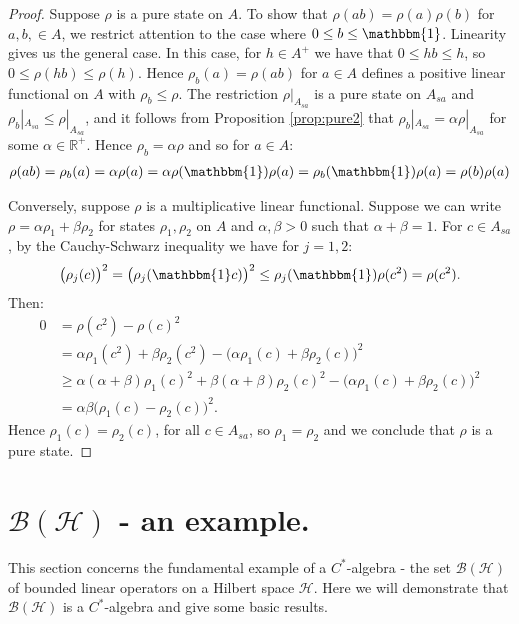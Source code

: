 \documentclass[12pt,a4paper]{report}
\theoremstyle{plain}
\theoremstyle{definition}
\newcommand{\1}{\mathbbm{1}}
\newcommand{\R}{\mathbb{R}}
\renewcommand{\H}{\mathcal{H}}
\newcommand{\B}{\mathcal{B}}
\begin{document}
\begin{proof}
	Suppose $\rho$ is a pure state on $A$. To show that $\rho(ab)=\rho(a)\rho(b)$ for $a,b,\in A$,
	we restrict attention to the case where $0\leq b\leq\1$. Linearity gives us the general case.
	In this case, for $h\in A^+$ we have that $0\leq hb\leq h$, so $0\leq\rho(hb)\leq\rho(h)$.
	Hence $\rho_b(a)=\rho(ab)$ for $a\in A$ defines a positive linear functional on $A$ with 
	$\rho_b\leq\rho$. The restriction $\rho|_{A_{sa}}$ is a pure state on $A_{sa}$ and 
	$\rho_b|_{A_{sa}} \leq \rho|_{A_{sa}}$, and it follows from Proposition \ref{prop:pure2} that 
	$\rho_b|_{A_{sa}} = \alpha \rho|_{A_{sa}}$ for some $\alpha \in \R^+$.
	Hence $\rho_b = \alpha\rho$  and so for $a\in A$:
	\begin{align*}
		\rho(ab) = \rho_b(a) = \alpha\rho(a) = 
							\alpha\rho(\1)\rho(a) = \rho_b(\1)\rho(a) = \rho(b)\rho(a)
	\end{align*}
	
	Conversely, suppose $\rho$ is a multiplicative linear functional.  %
	Suppose we can write $\rho=\alpha\rho_1+\beta\rho_2$ for states $\rho_1,\rho_2$ on $A$ and 
	$\alpha,\beta >0$ such that $\alpha+\beta=1$. For $c\in A_{sa}$, by the Cauchy-Schwarz inequality
	 we have for $j=1,2$:
	\begin{align*}
		\big(\rho_j(c)\big)^2 = \big(\rho_j(\1 c)\big)^2 \leq \rho_j(\1)\rho(c^2)=\rho(c^2).
	\end{align*}
	Then:
	\begin{align*}
				0
		&=		\rho(c^2)-\rho(c)^2 											\\
		&=		\alpha\rho_1(c^2)+\beta\rho_2(c^2) 
						- \big(\alpha\rho_1(c)+\beta\rho_2(c)\big)^2			\\
		&\geq	\alpha(\alpha+\beta)\rho_1(c)^2 
						+ \beta(\alpha+\beta)\rho_2(c)^2
						- \big(\alpha\rho_1(c)+\beta\rho_2(c)\big)^2			\\
		&=		\alpha\beta\big(\rho_1(c) - \rho_2(c)\big)^2.
	\end{align*}
	Hence $\rho_1(c)=\rho_2(c)$, for all $c\in A_{sa}$, so $\rho_1=\rho_2$ and we conclude
	that $\rho$ is a pure state. 
\end{proof}






\section{$\B(\H)$ - an example.}
This section concerns the fundamental example of a $C^\ast$-algebra - the set $\B(\H)$ of bounded 
linear operators on a Hilbert space $\H$.  
Here we will demonstrate that $\B(\H)$ is a $C^\ast$-algebra and give some basic results.
\end{document}
